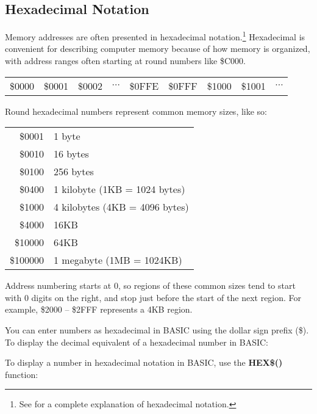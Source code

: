 \subsection{Hexadecimal Notation}

Memory addresses are often presented in hexadecimal notation.\footnote{See
 for a complete explanation of
hexadecimal notation.} Hexadecimal is convenient for describing computer memory because of
how memory is organized, with address ranges often starting at round numbers
like \$C000.

\begin{center}
\begin{tabular}{|c|c|c|c|c|c|c|c|c}
\cline{1-3}\cline{5-8}
\$0000 & \$0001 & \$0002 & $\cdots$ & \$0FFE & \$0FFF & \$1000 & \$1001 &
$\cdots$ \\
\cline{1-3}\cline{5-8}
\end{tabular}
\end{center}

Round hexadecimal numbers represent common memory sizes, like so:

\begin{center}
\begin{tabular}{rl}
\$0001 & 1 byte \\
\$0010 & 16 bytes \\
\$0100 & 256 bytes \\
\$0400 & 1 kilobyte (1KB = 1024 bytes) \\
\$1000 & 4 kilobytes (4KB = 4096 bytes) \\
\$4000 & 16KB \\
\$10000 & 64KB \\
\$100000 & 1 megabyte (1MB = 1024KB) \\
\end{tabular}
\end{center}

Address numbering starts at 0, so regions of these common sizes tend to start
with 0 digits on the right, and stop just before the start of the next region.
For example, \$2000 -- \$2FFF represents a 4KB region.

You can enter numbers as hexadecimal in BASIC using the dollar sign prefix
(\$). To display the decimal equivalent of a hexadecimal number in BASIC:


To display a number in hexadecimal notation in BASIC, use the
{\bf HEX\$()} function:

